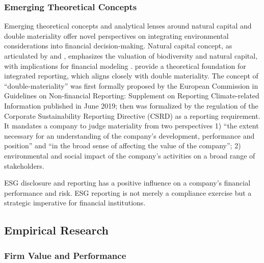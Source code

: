 \documentclass[
  authoryear]{elsarticle}
\begin{document}
\subsubsection{Emerging Theoretical
Concepts}\label{emerging-theoretical-concepts}

Emerging theoretical concepts and analytical lenses around natural
capital and double materiality offer novel perspectives on integrating
environmental considerations into financial decision-making. Natural
capital concept, as articulated by \citet{DASGUPTA2021} and
\citet{DAILY2009}, emphasizes the valuation of biodiversity and natural
capital, with implications for financial modeling \citep{ATKINSON2014}.
\citet{ECCLES2014} provide a theoretical foundation for integrated
reporting, which aligns closely with double materiality. The concept of
``double-materiality'' was first formally proposed by the European
Commission \citep{EC2019} in Guidelines on Non-financial Reporting:
Supplement on Reporting Climate-related Information published in June
2019; then was formalized by the regulation of the Corporate
Sustainability Reporting Directive (CSRD)\citep[see][]{EU_CSRD_2022} as
a reporting requirement. It mandates a company to judge materiality from
two perspectives 1) ``the extent necessary for an understanding of the
company's development, performance and position'' and ``in the broad
sense of affecting the value of the company''; 2) environmental and
social impact of the company's activities on a broad range of
stakeholders.

ESG disclosure and reporting has a positive influence on a company's
financial performance and risk. ESG reporting is not merely a compliance
exercise but a strategic imperative for financial institutions.

\subsection{Empirical Research}\label{empirical-research}

\subsubsection{Firm Value and
Performance}\label{firm-value-and-performance}
\end{document}
